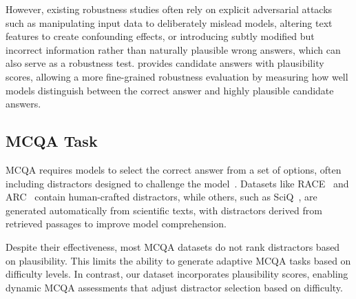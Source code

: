 However, existing robustness studies often rely on explicit adversarial attacks such as manipulating input data to deliberately mislead models, altering text features to create confounding effects, or introducing subtly modified but incorrect information rather than naturally plausible wrong answers, which can also serve as a robustness test. \datasetname provides candidate answers with plausibility scores, allowing a more fine-grained robustness evaluation by measuring how well models distinguish between the correct answer and highly plausible candidate answers.

\subsection{MCQA Task}
MCQA requires models to select the correct answer from a set of options, often including distractors designed to challenge the model~\cite{lai-etal-2017-race,2018arXiv180305457C}. Datasets like RACE~\cite{lai-etal-2017-race} and ARC~\cite{2018arXiv180305457C} contain human-crafted distractors, while others, such as SciQ~\cite{welbl-etal-2017-crowdsourcing}, are generated automatically from scientific texts, with distractors derived from retrieved passages to improve model comprehension.

Despite their effectiveness, most MCQA datasets do not rank distractors based on plausibility. This limits the ability to generate adaptive MCQA tasks based on difficulty levels. In contrast, our dataset incorporates plausibility scores, enabling dynamic MCQA assessments that adjust distractor selection based 
on difficulty.


